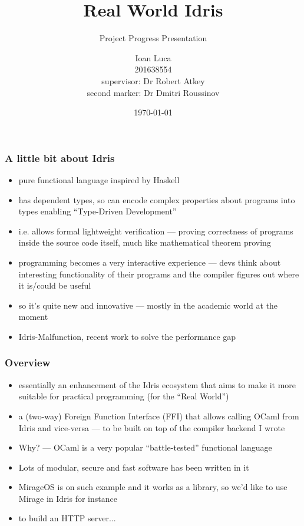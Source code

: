 \documentclass{beamer}
\title{Real World Idris}
\subtitle{Project Progress Presentation}
\author{Ioan Luca \\ 201638554 \\ \small supervisor: Dr Robert Atkey \\
	\small second marker: Dr Dmitri Roussinov \\}
\institute{University of Strathclyde}
\date{\today}
\begin{document}
\frame{\titlepage}


\begin{frame}
	\frametitle{A little bit about Idris}
	\begin{itemize}
		\item pure functional language inspired by Haskell
		\item has dependent types, so can encode complex properties
		      about programs into types enabling ``Type-Driven Development''
		\item i.e. allows formal lightweight verification --- proving
		      correctness of programs inside the source code itself,
		      much like mathematical theorem proving
		\item programming becomes a very interactive experience
		      --- devs think about interesting functionality of their programs
		      and the compiler figures out where it is/could be useful
		\item so it's quite new and innovative --- mostly 
		      in the academic world at the moment
		\item Idris-Malfunction, recent work to solve the performance gap
	\end{itemize}
\end{frame}


\begin{frame}
	\frametitle{Overview}

	\begin{itemize}
		\item essentially an enhancement of the Idris ecosystem
		      that aims to make it more suitable for practical
		      programming (for the ``Real World'')
		\item a (two-way) Foreign Function Interface (FFI) that
		      allows calling OCaml
		      from Idris and vice-versa --- to be built on top of the
		      compiler backend I wrote
		\item Why? --- OCaml is a very popular ``battle-tested''
		      functional language
		\item Lots of modular, secure and fast software has been written in it
		\item MirageOS is on such example and it works as a library, so we'd
		      like to use Mirage in Idris for instance
		\item to build an HTTP server...
	\end{itemize}
\end{frame}
\end{document}
